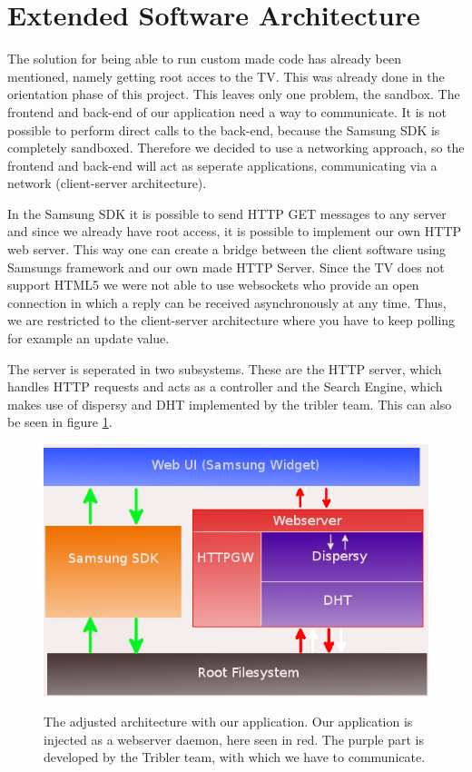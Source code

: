 \clearpage

\section{Extended Software Architecture}
The solution for being able to run custom made code has already been mentioned, namely getting root acces to the TV.
This was already done in the orientation phase of this project. This leaves only one problem, the sandbox.
The frontend and back-end of our application need a way to communicate. It is not possible to perform direct calls to the back-end, because the 
Samsung SDK is completely sandboxed. Therefore we decided to use a networking approach, so the frontend and back-end will act as seperate 
applications, communicating via a network (client-server architecture).

In the Samsung SDK it is possible to send HTTP GET messages to any server and since we already have root access, it is possible to implement
our own HTTP web server. This way one can create a bridge between the client software using Samsung\textquotesingle s framework and our own made 
HTTP Server. Since the TV does not support HTML5 we were not able to use websockets who provide an open connection in which a reply can be 
received asynchronously at any time. Thus, we are restricted to the client-server architecture where you have to keep polling for example an 
update value.

The server is seperated in two subsystems. These are the HTTP server, which handles HTTP requests and acts as a controller and the Search Engine, 
which makes use of dispersy and DHT implemented by the tribler team. This can also be seen in figure \ref{fig:architecture}.

\begin{center}
\begin{figure}[h]
	\centering
	\mbox{\includegraphics[width=1\textwidth]{Images/architecture.png}}
	\label{fig:architecture}
	\caption{The adjusted architecture with our application. Our application is injected as a webserver daemon, here seen in red. 
	The purple part is developed by the Tribler team, with which we have to communicate.}
\end{figure}
\end{center}
\clearpage


